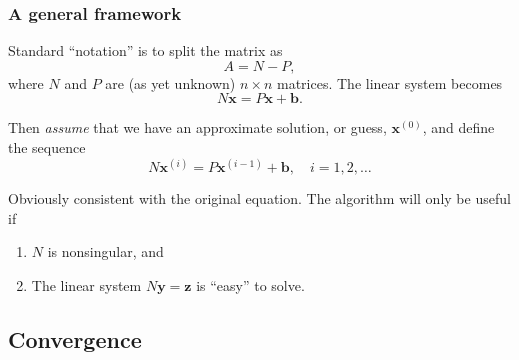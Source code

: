 \documentclass{beamer}
\newcommand{\bb}{{\boldsymbol{b}}}
\newcommand{\bx}{{\boldsymbol{x}}}
\newcommand{\bfm}[1]{{\boldsymbol{#1}}}
\begin{document}
\begin{frame}
  \frametitle{A general framework}

  Standard ``notation'' is to split the matrix as
  \begin{equation*}
    A = N - P,
  \end{equation*}
  where $N$ and $P$ are (as yet unknown) $n \times n$ matrices.
  The linear system becomes
  \begin{equation*}
    N \bx = P \bx + \bb.
  \end{equation*} \pause

  Then \emph{assume} that we have an approximate solution, or guess,
  $\bx^{(0)}$, and define the sequence
  \begin{equation*}
    N \bx^{(i)} = P \bx^{(i - 1)} + \bb, \quad i = 1, 2, \dots
  \end{equation*} \pause

  Obviously consistent with the original equation.  The algorithm will
  only be useful if
  \begin{enumerate}
  \item $N$ is nonsingular, and
  \item The linear system $N \bfm{y} = \bfm{z}$ is ``easy'' to solve.
  \end{enumerate}

\end{frame}


\subsection{Convergence}
\end{document}
